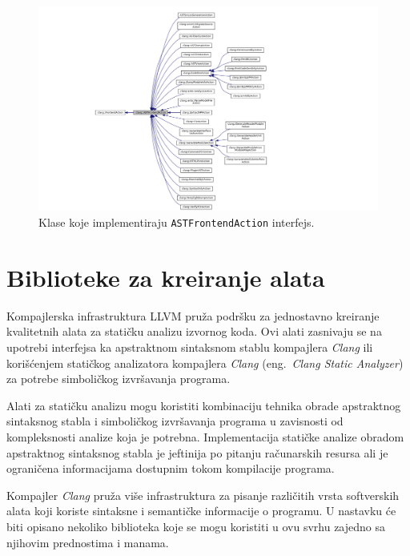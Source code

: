 \documentclass[12pt,oneside]{memoir}
\begin{document}
\begin{figure}[h!]
\begin{center}
\includegraphics[scale=0.4]{ASTFrontendAction.png}
\end{center}
\caption{Klase koje implementiraju \texttt{ASTFrontendAction} interfejs.}
\label{fig:ASTAction}
\end{figure}



\section{Biblioteke za kreiranje alata}

Kompajlerska infrastruktura LLVM pru\v{z}a podr\v{s}ku za jednostavno kreiranje kvalitetnih alata za stati\v{c}ku analizu izvornog koda. Ovi alati
zasnivaju se na upotrebi interfejsa ka apstraktnom sintaksnom stablu kompajlera \textit{Clang} ili kori\v{s}\'{c}enjem stati\v{c}kog analizatora kompajlera \textit{Clang} (eng.~\textit{Clang Static Analyzer}) za potrebe simboli\v{c}kog izvr\v{s}avanja programa. \par Alati za stati\v{c}ku analizu mogu koristiti kombinaciju tehnika obrade apstraktnog sintaksnog stabla i simboli\v{c}kog izvr\v{s}avanja programa u zavisnosti od kompleksnosti analize koja je potrebna. Implementacija stati\v{c}ke analize obradom apstraktnog sintaksnog stabla je jeftinija po pitanju ra\v{c}unarskih resursa ali je ograni\v{c}ena informacijama dostupnim tokom kompilacije programa. \par 

 Kompajler \textit{Clang} pru\v{z}a vi\v{s}e infrastruktura za pisanje razli\v{c}itih vrsta softverskih alata koji koriste sintaksne i semanti\v{c}ke informacije o programu. U nastavku \'{c}e biti opisano nekoliko biblioteka koje se mogu koristiti u ovu svrhu zajedno sa njihovim prednostima i manama.
\end{document}
